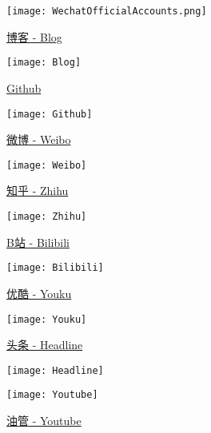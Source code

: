 \begin{figure}[htbp]
    \centering
    \texttt{[image: WechatOfficialAccounts.png]}
\end{figure}
\vspace*{-4ex}

\begin{figure}[htbp]
    \centering
    \begin{minipage}[t]{0.2\textwidth}
        \centering
        \setlength{\abovecaptionskip}{1pt}
        \caption*{\href{https://mister-kin.github.io}{博客 - Blog}}
        \texttt{[image: Blog]}
    \end{minipage}
    \qquad
    \begin{minipage}[t]{0.2\textwidth}
        \centering
        \setlength{\abovecaptionskip}{1pt}
        \caption*{\href{https://github.com/mister-kin}{Github}}
        \texttt{[image: Github]}
    \end{minipage}
    \qquad
    \begin{minipage}[t]{0.2\textwidth}
        \centering
        \setlength{\abovecaptionskip}{1pt}
        \caption*{\href{https://weibo.com/6270111192/profile?topnav=1&wvr=6&is_all=1}{微博 - Weibo}}
        \texttt{[image: Weibo]}
    \end{minipage}
    \qquad
    \begin{minipage}[t]{0.2\textwidth}
        \centering
        \setlength{\abovecaptionskip}{1pt}
        \caption*{\href{https://www.zhihu.com/people/drwu-94}{知乎 - Zhihu}}
        \texttt{[image: Zhihu]}
    \end{minipage}
    \qquad

    \begin{minipage}[t]{0.2\textwidth}
        \centering
        \setlength{\abovecaptionskip}{1pt}
        \setlength{\belowcaptionskip}{10pt}
        \caption*{\href{http://space.bilibili.com/17025250?}{B站 - Bilibili}}
        \texttt{[image: Bilibili]}
    \end{minipage}
    \qquad
    \begin{minipage}[t]{0.2\textwidth}
        \centering
        \setlength{\abovecaptionskip}{1pt}
        \setlength{\belowcaptionskip}{10pt}
        \caption*{\href{http://i.youku.com/i/UNjA3MTk5Mjgw?spm=a2hzp.8253869.0.0}{优酷 - Youku}}
        \texttt{[image: Youku]}
    \end{minipage}
    \qquad
    \begin{minipage}[t]{0.2\textwidth}
        \centering
        \setlength{\abovecaptionskip}{1pt}
        \setlength{\belowcaptionskip}{10pt}
        \caption*{\href{https://www.toutiao.com/c/user/835254071079053/\#mid=1663279303982091}{头条 - Headline}}
        \texttt{[image: Headline]}
    \end{minipage}
    \qquad
    \begin{minipage}[t]{0.2\textwidth}
        \centering
        \setlength{\abovecaptionskip}{1pt}
        \setlength{\belowcaptionskip}{10pt}
        \caption*{\href{https://www.youtube.com/channel/UCXqjfWLzMlRKxGC8syWj17Q?view_as=public}{油管 - Youtube}}
        \texttt{[image: Youtube]}
    \end{minipage}
    \qquad
\end{figure}
